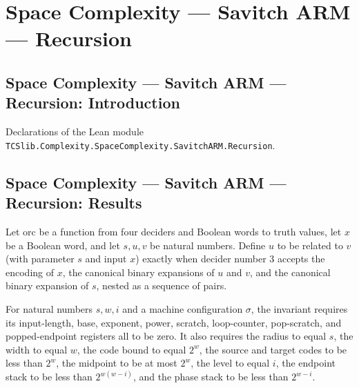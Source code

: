 \section{Space Complexity --- Savitch ARM --- Recursion}
\subsection*{Space Complexity --- Savitch ARM --- Recursion: Introduction}

Declarations of the Lean module \texttt{TCSlib.Complexity.SpaceComplexity.SavitchARM.Recursion}.

\subsection*{Space Complexity --- Savitch ARM --- Recursion: Results}

\begin{definition}
\label{Complexity.LogProg.SavitchARM.Rel}
\leanok
{}
Let $\mathrm{orc}$ be a function from four deciders and Boolean words to truth values,
let $x$ be a Boolean word, and let $s,u,v$ be natural numbers. Define $u$ to be related
to $v$ (with parameter $s$ and input $x$) exactly when decider number $3$ accepts the
encoding of $x$, the canonical binary expansions of $u$ and $v$, and the canonical
binary expansion of $s$, nested as a sequence of pairs.
\end{definition}

\begin{definition}
\label{Complexity.LogProg.SavitchARM.Inv}
\leanok
{}
For natural numbers $s,w,i$ and a machine configuration $\sigma$, the invariant requires
its input-length, base, exponent, power, scratch, loop-counter, pop-scratch, and
popped-endpoint registers all to be zero. It also requires the radius to equal $s$, the
width to equal $w$, the code bound to equal $2^w$, the source and target codes to be
less than $2^w$, the midpoint to be at most $2^w$, the level to equal $i$, the endpoint
stack to be less than $2^{w(w-i)}$, and the phase stack to be less than $2^{w-i}$.
\end{definition}

